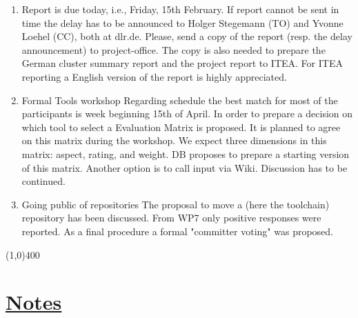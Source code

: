 \documentclass[a4paper]{article}
\begin{document}
\begin{enumerate}

\item Report is due today, i.e., Friday, 15th February.\newline
If report cannot be sent in time the delay has to be announced to Holger Stegemann (TO) and Yvonne Loehel (CC), both at dlr.de.\newline
Please, send a copy of the report (resp. the delay announcement) to project-office. The copy is also needed to prepare the German cluster summary report and the project report to ITEA. 
For ITEA reporting a English version of the report is highly appreciated.

\item Formal Tools workshop\newline
Regarding schedule the best match for most of the participants is week beginning 15th of April. In order to prepare a decision on which tool to select a Evaluation Matrix is proposed. It is planned to agree on this matrix during the workshop. We expect three dimensions in this matrix: aspect, rating, and weight. DB proposes to prepare a  starting version of this matrix. Another option is to call input via Wiki. Discussion has to be continued.

\item Going public of repositories\newline
The proposal to move a (here the toolchain) repository has been discussed. From WP7 only positive responses were reported. As a final procedure a formal "committer voting" was proposed.

\end{enumerate}

\line(1,0){400}
\section*{\underline{Notes}}
\end{document}
